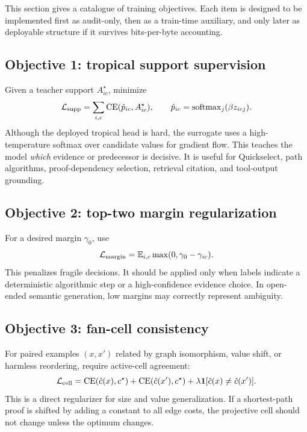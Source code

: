 \documentclass[11pt]{article}
\newcommand{\E}{\mathbb{E}}
\newcommand{\calL}{\mathcal{L}}
\newcommand{\softmax}{\operatorname{softmax}}
\begin{document}
This section gives a catalogue of training objectives.  Each item is designed to be implemented first as audit-only, then as a train-time auxiliary, and only later as deployable structure if it survives bits-per-byte accounting.

\subsection{Objective 1: tropical support supervision}

Given a teacher support \(A^\star_{ic}\), minimize
\begin{equation}
\calL_{\rm supp}=\sum_{i,c}\operatorname{CE}(\hat p_{ic},A^\star_{ic}),\qquad \hat p_{ic}=\softmax_j(\beta z_{icj}).
\end{equation}
Although the deployed tropical head is hard, the surrogate uses a high-temperature softmax over candidate values for gradient flow.  This teaches the model \emph{which} evidence or predecessor is decisive.  It is useful for Quickselect, path algorithms, proof-dependency selection, retrieval citation, and tool-output grounding.

\subsection{Objective 2: top-two margin regularization}

For a desired margin \(\gamma_0\), use
\begin{equation}
\calL_{\rm margin}=\E_{i,c}\max(0,\gamma_0-\gamma_{ic}).
\end{equation}
This penalizes fragile decisions.  It should be applied only when labels indicate a deterministic algorithmic step or a high-confidence evidence choice.  In open-ended semantic generation, low margins may correctly represent ambiguity.

\subsection{Objective 3: fan-cell consistency}

For paired examples \((x,x')\) related by graph isomorphism, value shift, or harmless reordering, require active-cell agreement:
\begin{equation}
\calL_{\rm cell}=\operatorname{CE}(\hat c(x),c^\star)+\operatorname{CE}(\hat c(x'),c^\star)+\lambda\mathbf{1}[\hat c(x)\ne\hat c(x')].
\end{equation}
This is a direct regularizer for size and value generalization.  If a shortest-path proof is shifted by adding a constant to all edge costs, the projective cell should not change unless the optimum changes.
\end{document}

